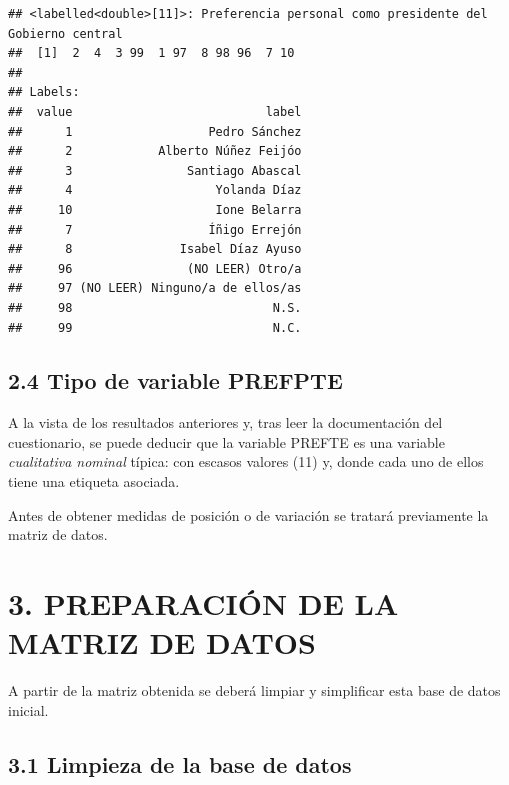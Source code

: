 \documentclass[
]{article}
\newenvironment{Shaded}{\begin{snugshade}}{\end{snugshade}}
\newcommand{\FunctionTok}[1]{\textcolor[rgb]{0.13,0.29,0.53}{\textbf{#1}}}
\newcommand{\NormalTok}[1]{#1}
\newcommand{\SpecialCharTok}[1]{\textcolor[rgb]{0.81,0.36,0.00}{\textbf{#1}}}
\begin{document}
\begin{Shaded}
\end{Shaded}

\begin{verbatim}
## <labelled<double>[11]>: Preferencia personal como presidente del Gobierno central
##  [1]  2  4  3 99  1 97  8 98 96  7 10
## 
## Labels:
##  value                           label
##      1                   Pedro Sánchez
##      2            Alberto Núñez Feijóo
##      3                Santiago Abascal
##      4                    Yolanda Díaz
##     10                    Ione Belarra
##      7                   Íñigo Errejón
##      8               Isabel Díaz Ayuso
##     96                (NO LEER) Otro/a
##     97 (NO LEER) Ninguno/a de ellos/as
##     98                            N.S.
##     99                            N.C.
\end{verbatim}

\hypertarget{tipo-de-variable-prefpte}{%
\subsection{2.4 Tipo de variable
PREFPTE}\label{tipo-de-variable-prefpte}}

A la vista de los resultados anteriores y, tras leer la documentación
del cuestionario, se puede deducir que la variable PREFTE es una
variable \emph{cualitativa nominal} típica: con escasos valores (11) y,
donde cada uno de ellos tiene una etiqueta asociada.

Antes de obtener medidas de posición o de variación se tratará
previamente la matriz de datos.

\hypertarget{preparaciuxf3n-de-la-matriz-de-datos}{%
\section{3. PREPARACIÓN DE LA MATRIZ DE
DATOS}\label{preparaciuxf3n-de-la-matriz-de-datos}}

A partir de la matriz obtenida se deberá limpiar y simplificar esta base
de datos inicial.

\hypertarget{limpieza-de-la-base-de-datos}{%
\subsection{3.1 Limpieza de la base de
datos}\label{limpieza-de-la-base-de-datos}}
\end{document}
